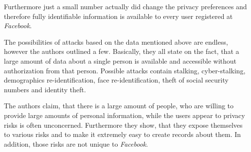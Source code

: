 Furthermore just a small number actually did change the privacy preferences and
therefore fully identifiable information is available to every user registered
at \textit{Facebook}.

The possibilities of attacks based on the data mentioned above are endless,
however the authors outlined a few. Basically, they all state on the fact, that
a large amount of data about a single person is available and accessible
without authorization from that person. Possible attacks contain stalking,
cyber-stalking, demographics re-identification, face re-identification, theft of
social security numbers and identity theft.

The authors claim, that there is a large amount of people, who are willing to
provide large amounts of personal information, while the users appear to
privacy risks is often unconcerned. Furthermore they show, that they expose
themselves to various risks and to make it extremely easy to create records
about them. In addition, those risks are not unique to \textit{Facebook}.
